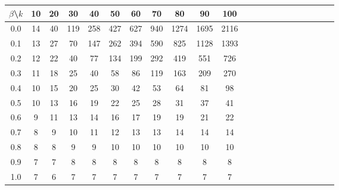 \begin{tabular}{Sc Sc Sc Sc Sc Sc Sc Sc Sc ScSc }
\toprule

$\beta$\textbackslash$k$ &  10  &  20  &  30  &  40  &  50  &  60  &  70  &  80  &  90  &  100 \\

\midrule

0.0 &   14 &   40 &  119 &  258 &  427 &  627 &  940 & 1274 & 1695 & 2116 \\

0.1 &   13 &   27 &   70 &  147 &  262 &  394 &  590 &  825 & 1128 & 1393 \\

0.2 &   12 &   22 &   40 &   77 &  134 &  199 &  292 &  419 &  551 &  726 \\

0.3 &   11 &   18 &   25 &   40 &   58 &   86 &  119 &  163 &  209 &  270 \\

0.4 &   10 &   15 &   20 &   25 &   30 &   42 &   53 &   64 &   81 &   98 \\

0.5 &   10 &   13 &   16 &   19 &   22 &   25 &   28 &   31 &   37 &   41 \\

0.6 &    9 &   11 &   13 &   14 &   16 &   17 &   19 &   19 &   21 &   22 \\

0.7 &    8 &    9 &   10 &   11 &   12 &   13 &   13 &   14 &   14 &   14 \\

0.8 &    8 &    8 &    9 &    9 &   10 &   10 &   10 &   10 &   10 &   10 \\

0.9 &    7 &    7 &    8 &    8 &    8 &    8 &    8 &    8 &    8 &    8 \\

1.0 &    7 &    6 &    7 &    7 &    7 &    7 &    7 &    7 &    7 &    7 \\

\bottomrule

\end{tabular}

